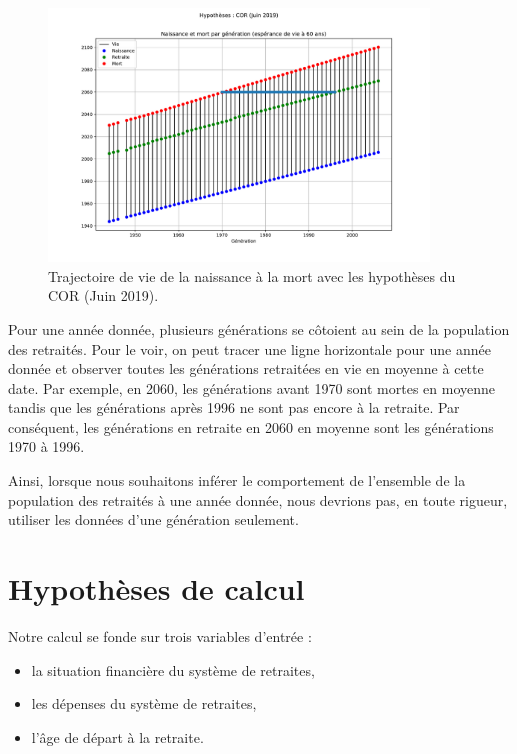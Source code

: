 \documentclass[10pt]{article}
\begin{document}
\begin{figure}
\begin{center}
\includegraphics[width=0.9\textwidth]{Simulation-generation-vs-annee.pdf}
\end{center}
\caption{Trajectoire de vie de la naissance à la mort avec 
les hypothèses du COR (Juin 2019).}
\label{fig-trajectoire-vie}
\end{figure}

Pour une année donnée, plusieurs générations se côtoient au sein de la population des retraités. 
Pour le voir, on peut tracer une ligne horizontale pour une année donnée et observer toutes les générations retraitées en vie en moyenne à cette date. 
Par exemple, en 2060, les générations avant 1970 sont mortes en moyenne tandis que les générations après 1996 ne sont pas encore à la retraite. 
Par conséquent, les générations en retraite en 2060 en moyenne sont les générations 1970 à 1996. 

Ainsi, lorsque nous souhaitons inférer le comportement de l'ensemble de la 
population des retraités à une année donnée, nous devrions pas, en toute 
rigueur, utiliser les données d'une génération seulement. 


\section{Hypothèses de calcul}

Notre calcul se fonde sur trois variables d'entrée :
\begin{itemize}
\item la situation financière du système de retraites, 
\item les dépenses du système de retraites, 
\item l'âge de départ à la retraite. 
\end{itemize}
\end{document}

